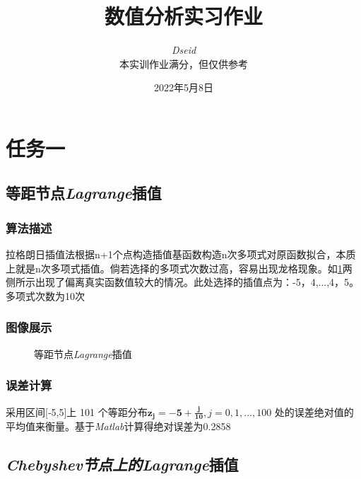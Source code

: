 \documentclass{ctexart}%
\title { 数值分析实习作业 }
\author { {\large \textit{Dseid}}\\ {\small 本实训作业满分，但仅供参考} }
\date { 2022年5月8日 }
\begin{document}
\maketitle

\tableofcontents
\thispagestyle{empty}
\clearpage

\section{任务一}
\setcounter{page}{1}
\subsection{等距节点\textit{Lagrange}插值}
\subsubsection{算法描述}
拉格朗日插值法根据n+1个点构造插值基函数构造n次多项式对原函数拟合，本质上就是n次多项式插值。倘若选择的多项式次数过高，容易出现龙格现象。如\ref{lagrange}两侧所示出现了偏离真实函数值较大的情况。此处选择的插值点为：-5，4,...,4，5。多项式次数为10次
\subsubsection{图像展示}
\begin{figure}[htp]
    \centering
    
    \caption{等距节点\textit{Lagrange}插值}
    \label{lagrange}
\end{figure}

\subsubsection{误差计算}
采用区间[‐5,5]上 101 个等距分布$\mathbf{z_j=-5+\frac{j}{10}},j=0,1,...,100$
处的误差绝对值的平均值来衡量。基于\textit{Matlab}计算得绝对误差为0.2858

\subsection{\textit{Chebyshev节点上的}\textit{Lagrange}插值}
\end{document}
